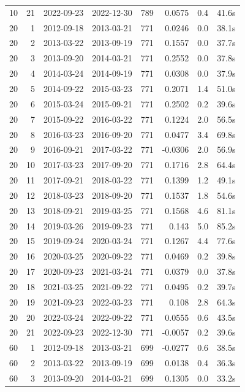 \documentclass[10pt]{article}
\begin{document}
\begin{longtable}{lrrrrrrr}
10 & 21 & 2022-09-23 & 2022-12-30 & 789 & 0.0575 & 0.4 & 41.6s \\
20 & 1 & 2012-09-18 & 2013-03-21 & 771 & 0.0246 & 0.0 & 38.1s \\
20 & 2 & 2013-03-22 & 2013-09-19 & 771 & 0.1557 & 0.0 & 37.7s \\
20 & 3 & 2013-09-20 & 2014-03-21 & 771 & 0.2552 & 0.0 & 37.8s \\
20 & 4 & 2014-03-24 & 2014-09-19 & 771 & 0.0308 & 0.0 & 37.9s \\
20 & 5 & 2014-09-22 & 2015-03-23 & 771 & 0.2071 & 1.4 & 51.0s \\
20 & 6 & 2015-03-24 & 2015-09-21 & 771 & 0.2502 & 0.2 & 39.6s \\
20 & 7 & 2015-09-22 & 2016-03-22 & 771 & 0.1224 & 2.0 & 56.5s \\
20 & 8 & 2016-03-23 & 2016-09-20 & 771 & 0.0477 & 3.4 & 69.8s \\
20 & 9 & 2016-09-21 & 2017-03-22 & 771 & -0.0306 & 2.0 & 56.9s \\
20 & 10 & 2017-03-23 & 2017-09-20 & 771 & 0.1716 & 2.8 & 64.4s \\
20 & 11 & 2017-09-21 & 2018-03-22 & 771 & 0.1399 & 1.2 & 49.1s \\
20 & 12 & 2018-03-23 & 2018-09-20 & 771 & 0.1537 & 1.8 & 54.6s \\
20 & 13 & 2018-09-21 & 2019-03-25 & 771 & 0.1568 & 4.6 & 81.1s \\
20 & 14 & 2019-03-26 & 2019-09-23 & 771 & 0.143 & 5.0 & 85.2s \\
20 & 15 & 2019-09-24 & 2020-03-24 & 771 & 0.1267 & 4.4 & 77.6s \\
20 & 16 & 2020-03-25 & 2020-09-22 & 771 & 0.0469 & 0.2 & 39.8s \\
20 & 17 & 2020-09-23 & 2021-03-24 & 771 & 0.0379 & 0.0 & 37.8s \\
20 & 18 & 2021-03-25 & 2021-09-22 & 771 & 0.0495 & 0.2 & 39.7s \\
20 & 19 & 2021-09-23 & 2022-03-23 & 771 & 0.108 & 2.8 & 64.3s \\
20 & 20 & 2022-03-24 & 2022-09-22 & 771 & 0.0555 & 0.6 & 43.5s \\
20 & 21 & 2022-09-23 & 2022-12-30 & 771 & -0.0057 & 0.2 & 39.6s \\
60 & 1 & 2012-09-18 & 2013-03-21 & 699 & -0.0277 & 0.6 & 38.5s \\
60 & 2 & 2013-03-22 & 2013-09-19 & 699 & 0.0138 & 0.4 & 36.3s \\
60 & 3 & 2013-09-20 & 2014-03-21 & 699 & 0.1305 & 0.0 & 33.2s \\

\end{longtable}
\end{document}
